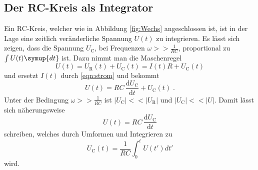 \subsection{Der RC-Kreis als Integrator}
Ein RC-Kreis, welcher wie in Abbildung \ref{fig:Wechs} angeschlossen ist, ist in der Lage eine zeitlich veränderliche Spannung $U(t)$ zu integrieren.
Es lässt sich zeigen, dass die Spannung $U_\text{C}$, bei Frequenzen $\omega >> \frac{1}{RC}$, proportional zu $\int U(t) \symup{dt}$ ist.
Dazu nimmt man die Maschenregel
\begin{equation}
    U(t)=U_\text{R}(t)+U_\text{C}(t) =I(t)R +U_\text{C}(t)
\end{equation}
und ersetzt $I(t)$ durch \eqref{eqn:strom} und bekommt
\begin{equation*}
    U(t)=RC\, \frac{\text{d}U_\text{C}}{\text{d}t} + U_\text{C}(t) \; \text{.}
\end{equation*}
Unter der Bedingung $\omega >> \frac{1}{RC}$ ist $|U_\text{C}| << |U_\text{R}|$ und $|U_\text{C}| << |U|$. 
Damit lässt sich näherungsweise 
\begin{equation*}
    U(t)=RC \, \frac{\text{d}U_\text{C}}{\text{d}t}
\end{equation*}
schreiben, welches durch Umformen und Integrieren zu
\begin{equation}
    U_\text{C}(t)=\frac{1}{RC} \int_0^t U(t') dt'
\end{equation}
wird.